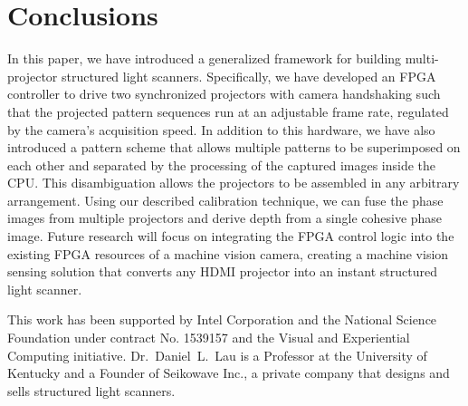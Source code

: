 \documentclass[]{spie}  %
\begin{document}
\section{Conclusions}
In this paper, we have introduced a generalized framework for building multi-projector structured light scanners. Specifically, we have developed an FPGA controller to drive two synchronized projectors with camera handshaking such that the projected pattern sequences run at an adjustable frame rate, regulated by the camera's acquisition speed.  In addition to this hardware, we have also introduced a pattern scheme that allows multiple patterns to be superimposed on each other and separated by the processing of the captured images inside the CPU.  This disambiguation allows the projectors to be assembled in any arbitrary arrangement. Using our described calibration technique, we can fuse the phase images from multiple projectors  and derive depth from a single cohesive phase image. Future research will focus on integrating the FPGA control logic into the existing FPGA resources of a machine vision camera, creating a machine vision sensing solution that converts any HDMI projector into an instant structured light scanner.

\acknowledgments
This work has been supported by Intel Corporation and the National Science Foundation under contract No. 1539157 and the Visual and Experiential Computing initiative. Dr.~Daniel~L.~Lau is a Professor at the University of Kentucky and a Founder of Seikowave Inc., a private company that designs and sells structured light scanners.

\end{document}
